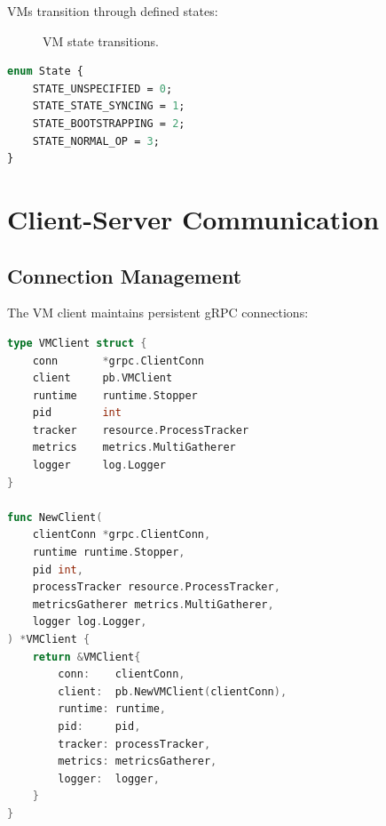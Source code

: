 \documentclass[11pt,letterpaper]{article}
\begin{document}
VMs transition through defined states:

\begin{figure}[h]
\centering
{}
\caption{VM state transitions.}
\label{fig:states}
\end{figure}

\begin{lstlisting}[language=protobuf, caption=State Enumeration]
enum State {
    STATE_UNSPECIFIED = 0;
    STATE_STATE_SYNCING = 1;
    STATE_BOOTSTRAPPING = 2;
    STATE_NORMAL_OP = 3;
}
\end{lstlisting}

\section{Client-Server Communication}

\subsection{Connection Management}

The VM client maintains persistent gRPC connections:

\begin{lstlisting}[language=Go, caption=Client Connection]
type VMClient struct {
    conn       *grpc.ClientConn
    client     pb.VMClient
    runtime    runtime.Stopper
    pid        int
    tracker    resource.ProcessTracker
    metrics    metrics.MultiGatherer
    logger     log.Logger
}

func NewClient(
    clientConn *grpc.ClientConn,
    runtime runtime.Stopper,
    pid int,
    processTracker resource.ProcessTracker,
    metricsGatherer metrics.MultiGatherer,
    logger log.Logger,
) *VMClient {
    return &VMClient{
        conn:    clientConn,
        client:  pb.NewVMClient(clientConn),
        runtime: runtime,
        pid:     pid,
        tracker: processTracker,
        metrics: metricsGatherer,
        logger:  logger,
    }
}
\end{lstlisting}
\end{document}
